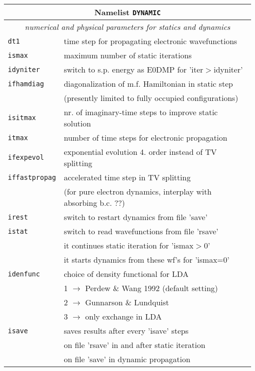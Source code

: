 \documentclass[12pt]{article}
\begin{document}
\begin{tabular}{ll}
\hline
\multicolumn{2}{c}{Namelist {\tt DYNAMIC}} in {\tt for005.<name>} \\
\hline
\multicolumn{2}{c}{\it numerical and physical parameters for statics and dynamics} \\
\hline
{\tt dt1              }& time step for propagating electronic wavefunctions\\
{\tt ismax            }& maximum number of static iterations \\
{\tt idyniter         }& switch to s.p. energy as E0DMP for 'iter$>$idyniter'\\
{\tt ifhamdiag} & diagonalization of m.f. Hamiltonian in static step\\
& (presently limited to fully occupied configurations)\\
{\tt isitmax          }& nr. of imaginary-time steps to improve static solution\\
{\tt itmax            }& number of time steps for electronic propagation\\
{\tt ifexpevol} & exponential evolution 4. order instead of TV splitting\\
{\tt iffastpropag} & accelerated time step in TV splitting\\
  & (for pure electron dynamics, interplay with absorbing b.c. ??)\\
{\tt irest            }& switch to restart dynamics from file 'save'\\
{\tt istat            }& switch to read wavefunctions from file 'rsave'\\
{\tt } &\hspace*{1em}it continues static iteration for 'ismax$>$0' \\
{\tt } &\hspace*{1em}it starts dynamics from these wf's for 'ismax=0' \\
{\tt idenfunc} & choice of density functional for LDA\\
               & 1 $\rightarrow$ Perdew \& Wang 1992 (default setting)\\
               & 2 $\rightarrow$ Gunnarson \& Lundquist\\
               & 3  $\rightarrow$ only exchange in  LDA \\
{\tt isave            }& saves results after every 'isave' steps \\
{\tt                  }& on file 'rsave' in and after static iteration\\
{\tt                  }& on file 'save' in dynamic propagation\\

\end{tabular}
\end{document}
